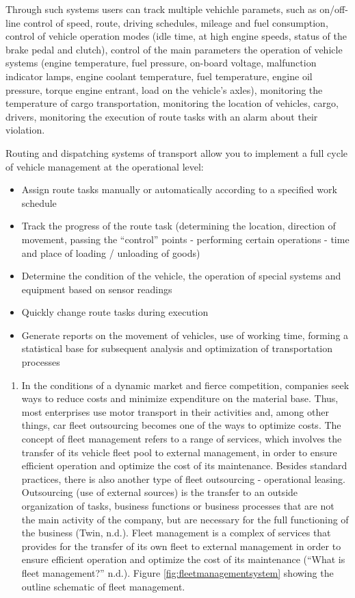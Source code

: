 \documentclass[12pt,twoside]{reedthesis}
\providecommand{\tightlist}{%
  \setlength{\itemsep}{0pt}\setlength{\parskip}{0pt}}
\begin{document}
Through such systems users can track multiple vehichle paramets, such as on/off-line control of speed, route, driving schedules, mileage and fuel consumption, control of vehicle operation modes (idle time, at high engine speeds, status of the brake pedal and clutch), control of the main parameters the operation of vehicle systems (engine temperature, fuel pressure, on-board voltage, malfunction indicator lamps, engine coolant temperature, fuel temperature, engine oil pressure, torque engine entrant, load on the vehicle's axles), monitoring the temperature of cargo transportation, monitoring the location of vehicles, cargo, drivers, monitoring the execution of route tasks with an alarm about their violation.

Routing and dispatching systems of transport allow you to implement a full cycle of vehicle management at the operational level:
\begin{itemize}
\tightlist
\item
  Assign route tasks manually or automatically according to a specified work schedule
\item
  Track the progress of the route task (determining the location, direction of movement, passing the ``control'' points - performing certain operations - time and place of loading / unloading of goods)
\item
  Determine the condition of the vehicle, the operation of special systems and equipment based on sensor readings
\item
  Quickly change route tasks during execution
\item
  Generate reports on the movement of vehicles, use of working time, forming a statistical base for subsequent analysis and optimization of transportation processes
\end{itemize}
\begin{enumerate}
\def\labelenumi{\arabic{enumi}.}
\setcounter{enumi}{1}
\tightlist
\item
  In the conditions of a dynamic market and fierce competition, companies seek ways to reduce costs and minimize expenditure on the material base. Thus, most enterprises use motor transport in their activities and, among other things, car fleet outsourcing becomes one of the ways to optimize costs. The concept of fleet management refers to a range of services, which involves the transfer of its vehicle fleet pool to external management, in order to ensure efficient operation and optimize the cost of its maintenance. Besides standard practices, there is also another type of fleet outsourcing - operational leasing. Outsourcing (use of external sources) is the transfer to an outside organization of tasks, business functions or business processes that are not the main activity of the company, but are necessary for the full functioning of the business (Twin, n.d.). Fleet management is a complex of services that provides for the transfer of its own fleet to external management in order to ensure efficient operation and optimize the cost of its maintenance (``What is fleet management?'' n.d.). Figure \ref{fig:fleetmanagementsystem} showing the outline schematic of fleet management.
\end{enumerate}
\end{document}
